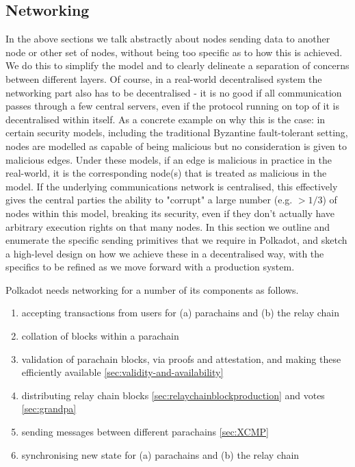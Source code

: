 \subsection{Networking}\label{sec:networking}

In the above sections we talk abstractly about nodes sending data to another
node or other set of nodes, without being too specific as to how this is
achieved. We do this to simplify the model and to clearly delineate a
separation of concerns between different layers. Of course, in a real-world
decentralised system the networking part also has to be decentralised - it is
no good if all communication passes through a few central servers, even if the
protocol running on top of it is decentralised within itself. As a concrete example on why this is the case: in certain security models, including
the traditional Byzantine fault-tolerant setting, nodes are modelled as capable
of being malicious but no consideration is given to malicious edges. Under
these models, if an edge is malicious in practice in the real-world, it is the
corresponding node(s) that is treated as malicious in the model. If the
underlying communications network is centralised, this effectively gives the
central parties the ability to "corrupt" a large number (e.g. $> 1/3$) of nodes
within this model, breaking its security, even if they don't actually have
arbitrary execution rights on that many nodes. In this section we outline and
enumerate the specific sending primitives that we require in Polkadot, and
sketch a high-level design on how we achieve these in a decentralised way, with
the specifics to be refined as we move forward with a production system.

Polkadot needs networking for a number of its components as follows.
\begin{enumerate}
\item accepting transactions from users for (a) parachains and (b) the relay chain
\item collation of blocks within a parachain
\item validation of parachain blocks, via proofs and attestation, and making these efficiently available \ref{sec:validity-and-availability}
\item distributing relay chain blocks \ref{sec:relaychainblockproduction} and votes \ref{sec:grandpa}
\item sending messages between different parachains \ref{sec:XCMP}
\item synchronising new state for (a) parachains and (b) the relay chain
\end{enumerate}

